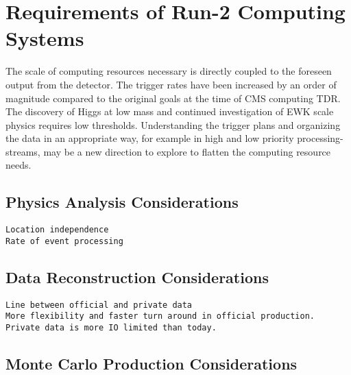 \section{Requirements of Run-2 Computing Systems}

The scale of computing resources necessary is directly coupled to the foreseen output from the
detector.  The trigger rates have been increased by an order of magnitude compared to the
original goals at the time of CMS computing TDR. The discovery of Higgs at low mass and
continued investigation of EWK scale physics requires low thresholds. Understanding the trigger
plans and organizing the data in an appropriate way, for example in high and low priority
processing-streams, may be a new direction to explore to flatten the computing resource needs.

\subsection{Physics Analysis Considerations}
\begin{verbatim}
Location independence
Rate of event processing
\end{verbatim}
\subsection{Data Reconstruction Considerations}
\begin{verbatim}
Line between official and private data
More flexibility and faster turn around in official production.  
Private data is more IO limited than today.
\end{verbatim}
\subsection{Monte Carlo Production Considerations}
